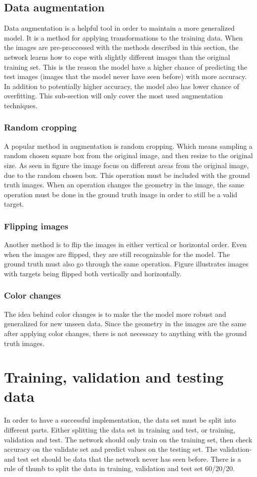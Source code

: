 \documentclass[USenglish]{ifimaster}  %
\begin{document}
\subsection{Data augmentation}
Data augmentation is a helpful tool in order to maintain a more generalized model. It is a method for applying transformations to the training data. When the images are pre-proccessed with the methods described in this section, the network learns how to cope with slightly different images than the original training set. This is the reason the model have a higher chance of predicting the test images (images that the model never have seen before) with more accuracy. In addition to potentially higher accuracy, the model also has lower chance of overfitting. This sub-section will only cover the most used augmentation techniques.  
\subsubsection{Random cropping}
A popular method in augmentation is random cropping. Which means sampling a random chosen square box from the original image, and then resize to the original size. As seen in figure  the image focus on different areas from the original image, due to the random chosen box. This operation must be included with the ground truth images. When an operation changes the geometry in the image, the same operation must be done in the ground truth image in order to still be a valid target. 
\subsubsection{Flipping images}
Another method is to flip the images in either vertical or horizontal order. Even when the images are flipped, they are still recognizable for the model. The ground truth must also go through the same operation. Figure  illustrates images with targets being flipped both vertically and horizontally.  
\subsubsection{Color changes}
The idea behind color changes is to make the the model more robust and generalized for new unseen data. Since the geometry in the images are the same after applying color changes, there is not necessary to anything with the ground truth images.
\section{Training, validation and testing data}
In order to have a successful implementation, the data set must be split into different parts. Either splitting the data set in training and test, or training, validation and test. The network should only train on the training set, then check accuracy on the validate set and predict values on the testing set. The validation- and test set should be data that the network never has seen before. There is a rule of thumb to split the data in training, validation and test set 60/20/20.  
\end{document}
